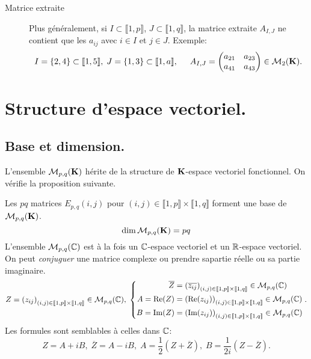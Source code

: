 \begin{description}
  \item[Matrice extraite]  Plus généralement, si $I\subset \llbracket 1,p \rrbracket$, $J\subset\llbracket 1,q \rrbracket$, la matrice extraite $A_{I,J}$ ne contient que les $a_{ij}$ avec $i\in I$ et $j\in J$.\newline
  Exemple:
\[
 I = \left\lbrace 2, 4\right\rbrace \subset \llbracket 1,5 \rrbracket, \;
 J = \left\lbrace 1, 3\right\rbrace \subset \llbracket 1,a \rrbracket,\hspace{0.5cm}
 A_{I,J} = 
 \begin{pmatrix}
 a_{2 1} & a_{2 3} \\ 
 a_{4 1} & a_{4 3}
 \end{pmatrix} 
 \in \mathcal{M}_{2}(\mathbf{K}).
\]
\end{description}

\section{Structure d'espace vectoriel.}
\subsection{Base et dimension.}
L'ensemble $\mathcal M_{p,q}(\mathbf{K})$ hérite de la structure de $\mathbf{K}$-espace vectoriel fonctionnel. On vérifie la proposition suivante.

Les $pq$ matrices $E_{p,q}(i,j)$ pour $(i,j)\in \llbracket 1,p \rrbracket\times \llbracket 1,q \rrbracket$ forment une base de $\mathcal M_{p,q}(\mathbf{K})$.
\begin{displaymath}
 \dim \mathcal M_{p,q}(\mathbf{K}) = pq
\end{displaymath}
L'ensemble $\mathcal{M}_{p,q}(\mathbb{C})$ est à la fois un $\mathbb{C}$-espace vectoriel et un $\mathbb{R}$-espace vectoriel. On peut \emph{conjuguer} une matrice complexe ou prendre sapartie réelle ou sa partie imaginaire.
\[
 Z = \left(z_{ij} \right)_{(i,j)\in\llbracket 1,p \rrbracket\times\llbracket 1,q \rrbracket} \in \mathcal{M}_{p,q}(\mathbb{C}),\;
 \left\lbrace 
 \begin{aligned}
  \overline{Z} &= \left(\overline{z_{ij}} \right)_{(i,j)\in\llbracket 1,p \rrbracket\times\llbracket 1,q \rrbracket} \in \mathcal{M}_{p,q}(\mathbb{C}) \\
   A = \mathop{\mathrm{Re}}(Z) &= \left(\mathop{\mathrm{Re}}(z_{ij}) \right)_{(i,j)\in\llbracket 1,p \rrbracket\times\llbracket 1,q \rrbracket} \in \mathcal{M}_{p,q}(\mathbb{C})\\
   B = \mathop{\mathrm{Im}}(Z) &= \left(\mathop{\mathrm{Im}}(z_{ij}) \right)_{(i,j)\in\llbracket 1,p \rrbracket\times\llbracket 1,q \rrbracket} \in \mathcal{M}_{p,q}(\mathbb{C})  
 \end{aligned}
\right. 
.
\]
Les formules sont semblables à celles dans $\mathbb{C}$:
\[
 Z = A + iB, \; \overline{Z} = A - iB,\; A = \frac{1}{2}(Z + \overline{Z}),\; B = \frac{1}{2i}(Z - \overline{Z}).
\]


